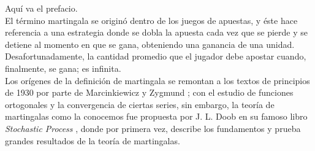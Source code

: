 Aquí va el prefacio. \\

El término martingala se originó dentro de los juegos de apuestas, y éste hace referencia a una estrategia donde se dobla la apuesta cada vez que se pierde y se detiene al momento en que se gana, obteniendo una ganancia de una unidad. Desafortunadamente, la cantidad promedio que el jugador debe apostar cuando, finalmente, se gana; es infinita. \\

Los orígenes de la definición de martingala se remontan a los textos de principios de 1930 por parte de Marcinkiewicz y Zygmund \cite{marczyg}; con el estudio de funciones ortogonales y la convergencia de ciertas series, sin embargo, la teoría de martingalas como la conocemos fue propuesta por J. L. Doob en su famoso libro \emph{Stochastic Process} \cite{doob}, donde por primera vez, describe los fundamentos y prueba grandes resultados de la teoría de martingalas.